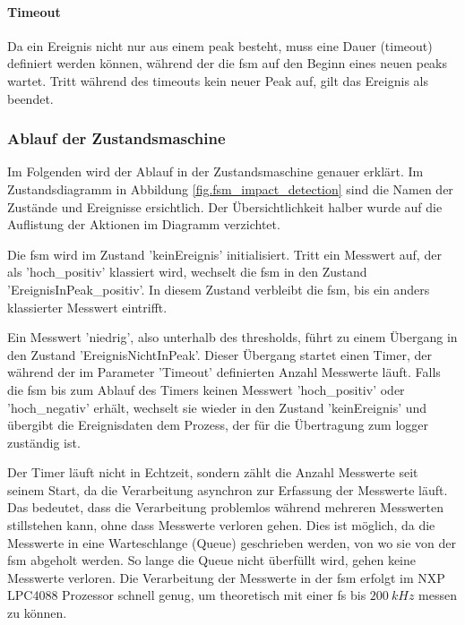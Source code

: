 \paragraph{Timeout} Da ein Ereignis nicht nur aus einem \gls{peak} besteht, muss eine Dauer (\gls{timeout}) definiert werden können, während der die \gls{fsm} auf den Beginn eines neuen \gls{peak}s wartet. Tritt während des \gls{timeout}s kein neuer Peak auf, gilt das Ereignis als beendet.

\subsubsection{Ablauf der Zustandsmaschine}
Im Folgenden wird der Ablauf in der Zustandsmaschine genauer erklärt. Im Zustandsdiagramm in Abbildung \ref{fig.fsm_impact_detection} sind die Namen der Zustände und Ereignisse ersichtlich. Der Übersichtlichkeit halber wurde auf die Auflistung der Aktionen im Diagramm verzichtet.

Die \gls{fsm} wird im Zustand 'keinEreignis' initialisiert. Tritt ein Messwert auf, der als 'hoch\_positiv' klassiert wird, wechselt die \gls{fsm} in den Zustand 'EreignisInPeak\_positiv'. In diesem Zustand verbleibt die \gls{fsm}, bis ein anders klassierter Messwert eintrifft. 

Ein Messwert 'niedrig', also unterhalb des \gls{threshold}s, führt zu einem Übergang in den Zustand 'EreignisNichtInPeak'. Dieser Übergang startet einen Timer, der während der im Parameter 'Timeout' definierten Anzahl Messwerte läuft. Falls die \gls{fsm} bis zum Ablauf des Timers keinen Messwert 'hoch\_positiv' oder 'hoch\_negativ' erhält, wechselt sie wieder in den Zustand 'keinEreignis' und übergibt die Ereignisdaten dem Prozess, der für die Übertragung zum \gls{logger} zuständig ist. 

Der Timer läuft nicht in Echtzeit, sondern zählt die Anzahl Messwerte seit seinem Start, da die Verarbeitung asynchron zur Erfassung der Messwerte läuft. Das bedeutet, dass die Verarbeitung problemlos während mehreren Messwerten stillstehen kann, ohne dass Messwerte verloren gehen. Dies ist möglich, da die Messwerte in eine Warteschlange (Queue) geschrieben werden, von wo sie von der \gls{fsm} abgeholt werden. So lange die Queue nicht überfüllt wird, gehen keine Messwerte verloren. Die Verarbeitung der Messwerte in der \gls{fsm} erfolgt im NXP LPC4088 Prozessor schnell genug, um theoretisch mit einer \gls{fs} bis \ensuremath{200~kHz} messen zu können.

